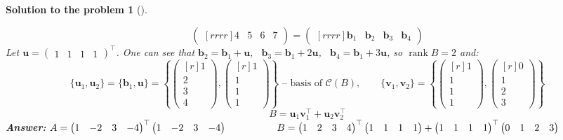 \documentclass[12pt,a4]{article}
\newtheorem{solution}{Solution to the problem}
\newcommand\rank{\operatorname{rank}}
\newcommand{\bb}{{\mathbf b}}
\newcommand{\bu}{{\mathbf u}}
\newcommand{\bv}{{\mathbf v}}
\renewcommand{\Im}{{\mathcal C}}
\newcommand{\answer}[1]{\textbf{Answer:} #1}
\begin{document}
\begin{solution}[]
\begin{enumerate}[(a)]
\[\begin{pmatrix}[rrrr]
4 & 5 & 6 & 7
\end{pmatrix} = \begin{pmatrix}[rrrr] \bb_1 & \bb_2 & \bb_3 & \bb_4 \end{pmatrix}
\]
Let $\bu =\begin{pmatrix}1&1&1&1\end{pmatrix}^\top$. One can see that $\bb_2 = \bb_1 + \bu$, ~$\bb_3 = \bb_1 + 2 \bu$, ~$\bb_4 = \bb_1 + 3 \bu$, so $\rank B = 2$ and:
\[
\{\bu_1, \bu_2\} = \{\bb_1, \bu\}=\left\{\begin{pmatrix}[r]1\\2\\3\\4\end{pmatrix}, \begin{pmatrix}[r]1\\1\\1\\1\end{pmatrix}\right\} \text{ -- basis of $\Im(B)$},
\qquad
\{\bv_1, \bv_2\} = \left\{\begin{pmatrix}[r]1\\1\\1\\1\end{pmatrix}, \begin{pmatrix}[r]0\\1\\2\\3\end{pmatrix}\right\}
\]
\[
B = \bu_1 \bv_1^\top + \bu_2 \bv_2^\top
\]
\answer{$
A = \begin{pmatrix}1&-2&3&-4\end{pmatrix}^\top\begin{pmatrix}1&-2&3&-4\end{pmatrix}
\\[6pt] \hspace*{18mm}
B = \begin{pmatrix}1&2&3&4\end{pmatrix}^\top\begin{pmatrix}1&1&1&1\end{pmatrix} +
\begin{pmatrix}1&1&1&1\end{pmatrix}^\top\begin{pmatrix}0&1&2&3\end{pmatrix}
$}\\[5pt]
\end{enumerate}
\end{solution}
\end{document}
